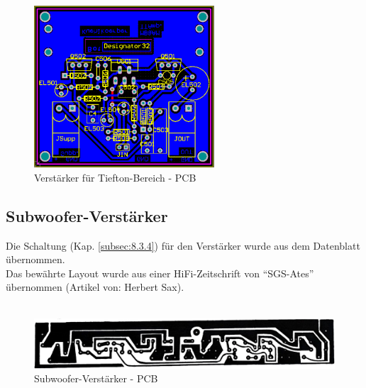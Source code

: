 \begin{figure} [H]
	\centering	
	\includegraphics[width=0.6\textwidth]{img/Print5/5_TTVerstaerker-PCB.PNG}
	\caption{Verstärker für Tiefton-Bereich - PCB}
	\label {fig:5.2.3.1}
\end{figure}


\newpage
\subsection{Subwoofer-Verstärker}
Die Schaltung (Kap. \ref{subsec:8.3.4}) für den Verstärker wurde aus dem Datenblatt übernommen.\\
Das bewährte Layout wurde aus einer HiFi-Zeitschrift von \enquote{SGS-Ates} übernommen (Artikel von: Herbert Sax).
\\ \\

\begin{figure} [H]
	\centering	
	\includegraphics[width=1\textwidth]{img/SubwooferAmpLayout.PNG}
	\caption{Subwoofer-Verstärker - PCB}
	\label {fig:5.2.3.2}
\end{figure}